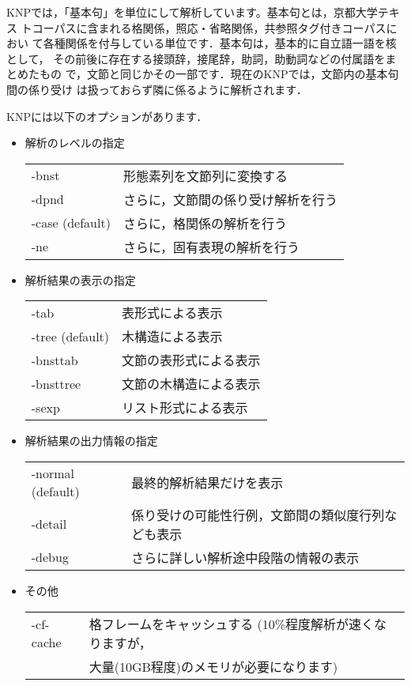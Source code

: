 \documentclass[a4j,11pt,titlepage]{jarticle}
\begin{document}
KNPでは，「基本句」を単位にして解析しています。基本句とは，京都大学テキス
トコーパスに含まれる格関係，照応・省略関係，共参照タグ付きコーパスにおい
て各種関係を付与している単位です．基本句は，基本的に自立語一語を核として，
その前後に存在する接頭辞，接尾辞，助詞，助動詞などの付属語をまとめたもの
で，文節と同じかその一部です．現在のKNPでは，文節内の基本句間の係り受け
は扱っておらず隣に係るように解析されます．

KNPには以下のオプションがあります．
\begin{itemize}
\item 解析のレベルの指定

\begin{tabular}{ll}
-bnst           & 形態素列を文節列に変換する \\
-dpnd           & さらに，文節間の係り受け解析を行う \\
-case (default) & さらに，格関係の解析を行う \\
-ne             & さらに，固有表現の解析を行う \\
\end{tabular}
\item 解析結果の表示の指定

\begin{tabular}{ll}
-tab            & 表形式による表示 \\
-tree (default) & 木構造による表示 \\
-bnsttab        & 文節の表形式による表示 \\
-bnsttree       & 文節の木構造による表示 \\
-sexp           & リスト形式による表示 \\
\end{tabular}
\item 解析結果の出力情報の指定

\begin{tabular}{ll}
-normal (default) & 最終的解析結果だけを表示 \\
-detail           & 係り受けの可能性行例，文節間の類似度行列なども表示 \\
-debug            & さらに詳しい解析途中段階の情報の表示 \\
\end{tabular}
\item その他

\begin{tabular}{ll}
-cf-cache         & 格フレームをキャッシュする (10\%程度解析が速くなりますが，\\
                  & 大量(10GB程度)のメモリが必要になります) \\
\end{tabular}
\end{itemize}
\end{document}

